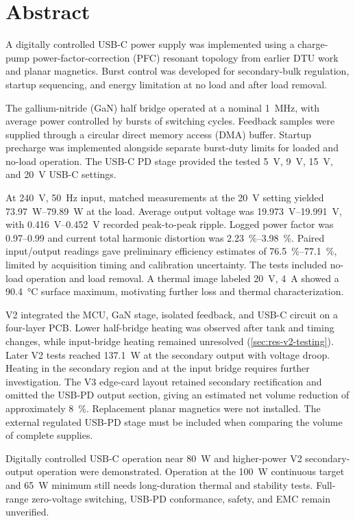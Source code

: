 \section*{Abstract}

A digitally controlled USB-C power supply was implemented using a charge-pump power-factor-correction (PFC) resonant topology from earlier DTU work and planar magnetics. Burst control was developed for secondary-bulk regulation, startup sequencing, and energy limitation at no load and after load removal.

The gallium-nitride (GaN) half bridge operated at a nominal \SI{1}{\mega\hertz}, with average power controlled by bursts of switching cycles. Feedback samples were supplied through a circular direct memory access (DMA) buffer. Startup precharge was implemented alongside separate burst-duty limits for loaded and no-load operation. The USB-C PD stage provided the tested \SI{5}{\volt}, \SI{9}{\volt}, \SI{15}{\volt}, and \SI{20}{\volt} USB-C settings.

At \SI{240}{\volt}, \SI{50}{\hertz} input, matched measurements at the \SI{20}{\volt} setting yielded \SIrange{73.97}{79.89}{\watt} at the load. Average output voltage was \SIrange{19.973}{19.991}{\volt}, with \SIrange{0.416}{0.452}{\volt} recorded peak-to-peak ripple. Logged power factor was 0.97--0.99 and current total harmonic distortion was \SIrange{2.23}{3.98}{\percent}. Paired input/output readings gave preliminary efficiency estimates of \SIrange{76.5}{77.1}{\percent}, limited by acquisition timing and calibration uncertainty. The tests included no-load operation and load removal. A thermal image labeled \SI{20}{\volt}, \SI{4}{\ampere} showed a \SI{90.4}{\celsius} surface maximum, motivating further loss and thermal characterization.

V2 integrated the MCU, GaN stage, isolated feedback, and USB-C circuit on a four-layer PCB. Lower half-bridge heating was observed after tank and timing changes, while input-bridge heating remained unresolved (\cref{sec:res-v2-testing}). Later V2 tests reached \SI{137.1}{\watt} at the secondary output with voltage droop. Heating in the secondary region and at the input bridge requires further investigation. The V3 edge-card layout retained secondary rectification and omitted the USB-PD output section, giving an estimated net volume reduction of approximately \SI{8}{\percent}. Replacement planar magnetics were not installed. The external regulated USB-PD stage must be included when comparing the volume of complete supplies.

Digitally controlled USB-C operation near \SI{80}{\watt} and higher-power V2 secondary-output operation were demonstrated. Operation at the \SI{100}{\watt} continuous target and \SI{65}{\watt} minimum still needs long-duration thermal and stability tests. Full-range zero-voltage switching, USB-PD conformance, safety, and EMC remain unverified.
